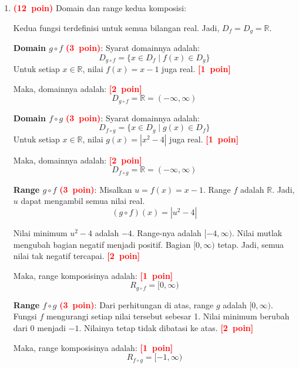 \documentclass[12pt,a4paper]{article}
\newcommand{\bobot}[1]{\mbox{\textcolor{red}{\textbf{(#1 poin)}}}}
\newcommand{\poin}[1]{\mbox{\textcolor{red}{\textbf{[#1 poin]}}}}
\begin{document}
\begin{enumerate}
\begin{enumerate}[label=\alph*.]
          \item \bobot{12} Domain dan range kedua komposisi:

                Kedua fungsi terdefinisi untuk semua bilangan real.
                Jadi, $D_f=D_g=\mathbb{R}$.

                \textbf{Domain $g \circ f$} \bobot{3}:
                Syarat domainnya adalah:
                \[ D_{g \circ f} = \{ x \in D_f \mid f(x) \in D_g \} \]
                Untuk setiap $x\in\mathbb{R}$, nilai $f(x)=x-1$ juga real. \poin{1}

                Maka, domainnya adalah: \poin{2}
                \[ D_{g \circ f}=\mathbb{R}=(-\infty,\infty) \]

                \par\noindent\begin{minipage}{\linewidth}
                  \textbf{Domain $f \circ g$} \bobot{3}:
                  Syarat domainnya adalah:
                  \[ D_{f \circ g} = \{ x \in D_g \mid g(x) \in D_f \} \]
                  Untuk setiap $x\in\mathbb{R}$, nilai $g(x)=|x^2-4|$ juga real. \poin{1}

                  Maka, domainnya adalah: \poin{2}
                  \[ D_{f \circ g}=\mathbb{R}=(-\infty,\infty) \]
                \end{minipage}\par

                \textbf{Range $g \circ f$} \bobot{3}:
                Misalkan $u=f(x)=x-1$.
                Range $f$ adalah $\mathbb{R}$.
                Jadi, $u$ dapat mengambil semua nilai real.
                \[ (g \circ f)(x)=|u^2-4| \]

                Nilai minimum $u^2-4$ adalah $-4$.
                Range-nya adalah $[-4,\infty)$.
                Nilai mutlak mengubah bagian negatif menjadi positif.
                Bagian $[0,\infty)$ tetap.
                Jadi, semua nilai tak negatif tercapai. \poin{2}

                Maka, range komposisinya adalah: \poin{1}
                \[ R_{g \circ f} = [0, \infty) \]

                \textbf{Range $f \circ g$} \bobot{3}:
                Dari perhitungan di atas, range $g$ adalah $[0,\infty)$.
                Fungsi $f$ mengurangi setiap nilai tersebut sebesar 1.
                Nilai minimum berubah dari 0 menjadi $-1$.
                Nilainya tetap tidak dibatasi ke atas. \poin{2}

                Maka, range komposisinya adalah: \poin{1}
                \[ R_{f \circ g}=[-1,\infty) \]
        \end{enumerate}


\end{enumerate}
\end{document}
